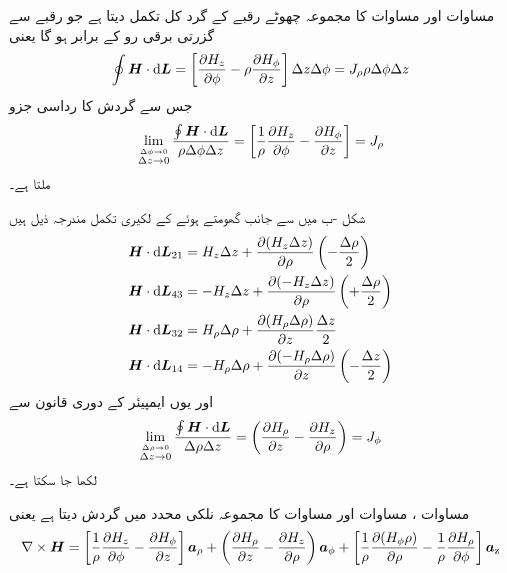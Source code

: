 مساوات  اور مساوات  کا مجموعہ چھوٹے رقبے کے گرد کل تکمل دیتا ہے جو رقبے سے گزرتی برقی رو  کے برابر ہو گا یعنی
\begin{align*}
\oint \kvec{H} \cdot \dif \kvec{L}=\left[ \frac{\partial H_z}{\partial \phi}-\rho\frac{\partial H_{\phi}}{\partial z} \right]\Delta z\Delta \phi=J_{\rho} \rho \Delta \phi \Delta z
\end{align*}
جس سے گردش کا رداسی جزو
\begin{align}\label{مساوات_مقناطیسی_رداسی_نلکی_گردش}
\lim_{\overset{\Delta \phi \to 0}{\Delta z \to 0}}\frac{\oint \kvec{H} \cdot \dif \kvec{L}}{\rho \Delta \phi \Delta z}=\left[\frac{1}{\rho}\frac{\partial H_z}{\partial \phi} -\frac{\partial H_{\phi}}{\partial z}\right]=J_{\rho}
\end{align}
ملتا ہے۔

شکل -ب میں  سے  جانب گھومتے ہوئے   کے لکیری تکمل مندرجہ ذیل ہیں
\begin{align*}
\kvec{H} \cdot \dif \kvec{L}_{21}&=H_z \Delta z+\frac{\partial (H_z \Delta z)}{\partial \rho}\left(-\frac{\Delta \rho}{2}\right)\\
\kvec{H} \cdot \dif \kvec{L}_{43}&=-H_z \Delta z+\frac{\partial (-H_z \Delta z)}{\partial \rho}\left(+\frac{\Delta \rho}{2}\right)\\
\kvec{H} \cdot \dif \kvec{L}_{32}&=H_{\rho}\Delta \rho+\frac{\partial (H_{\rho}\Delta \rho)}{\partial  z}\frac{\Delta z}{2}\\
\kvec{H} \cdot \dif \kvec{L}_{14}&=-H_{\rho}\Delta \rho+\frac{\partial (-H_{\rho}\Delta \rho)}{\partial z}\left(-\frac{\Delta z}{2}\right)
\end{align*}
اور یوں ایمپیئر کے دوری قانون سے
\begin{align}\label{مساوات_مقناطیسی_زاویاتی_نلکی_گردش}
\lim_{\overset{\Delta \rho \to 0}{\Delta z \to 0}}\frac{\oint \kvec{H} \cdot \dif \kvec{L}}{\Delta \rho \Delta z}=\left(\frac{\partial H_\rho}{\partial z}-\frac{\partial H_z}{\partial \rho} \right)=J_{\phi}
\end{align}
لکھا جا سکتا ہے۔

مساوات ، مساوات  اور مساوات  کا مجموعہ نلکی محدد میں گردش دیتا ہے یعنی
\begin{align}
\nabla \times {\ensuremath{{\boldsymbol{H}}}}=\left[\frac{1}{\rho}\frac{\partial H_z}{\partial \phi} -\frac{\partial H_{\phi}}{\partial z}\right]{\boldsymbol{a}}_{\rho}+\left(\frac{\partial H_\rho}{\partial z}-\frac{\partial H_z}{\partial \rho} \right){\boldsymbol{a}}_{\phi}+\left[\frac{1}{\rho}\frac{\partial (H_{\phi}\rho )}{\partial \rho}-\frac{1}{\rho}\frac{\partial H_{\rho}}{\partial \phi}\right]{\boldsymbol{a}}_{\textup{z}}
\end{align}

